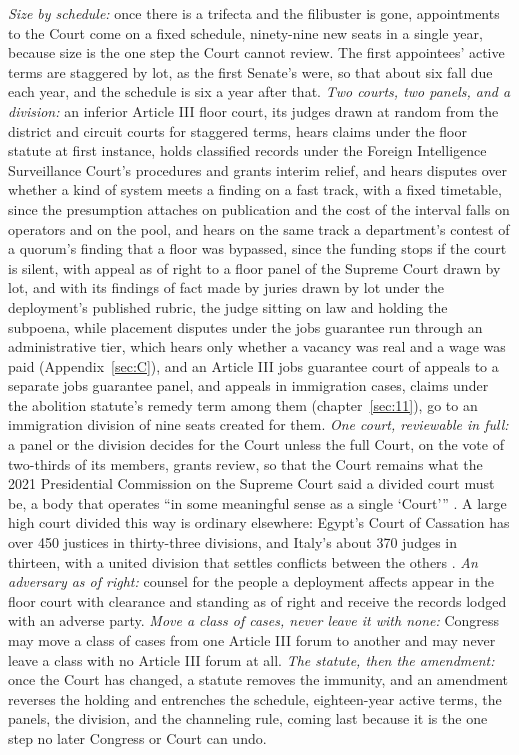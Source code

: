 \emph{Size by schedule:} once there is a trifecta and the filibuster is gone, appointments to the Court come on a fixed schedule, ninety-nine new seats in a single year, because size is the one step the Court cannot review. The first appointees' active terms are staggered by lot, as the first Senate's were, so that about six fall due each year, and the schedule is six a year after that. \emph{Two courts, two panels, and a division:} an inferior Article III floor court, its judges drawn at random from the district and circuit courts for staggered terms, hears claims under the floor statute at first instance, holds classified records under the Foreign Intelligence Surveillance Court's procedures and grants interim relief, and hears disputes over whether a kind of system meets a finding on a fast track, with a fixed timetable, since the presumption attaches on publication and the cost of the interval falls on operators and on the pool, and hears on the same track a department's contest of a quorum's finding that a floor was bypassed, since the funding stops if the court is silent, with appeal as of right to a floor panel of the Supreme Court drawn by lot, and with its findings of fact made by juries drawn by lot under the deployment's published rubric, the judge sitting on law and holding the subpoena, while placement disputes under the jobs guarantee run through an administrative tier, which hears only whether a vacancy was real and a wage was paid (Appendix~\ref{sec:C}), and an Article III jobs guarantee court of appeals to a separate jobs guarantee panel, and appeals in immigration cases, claims under the abolition statute's remedy term among them (chapter~\ref{sec:11}), go to an immigration division of nine seats created for them. \emph{One court, reviewable in full:} a panel or the division decides for the Court unless the full Court, on the vote of two-thirds of its members, grants review, so that the Court remains what the 2021 Presidential Commission on the Supreme Court said a divided court must be, a body that operates “in some meaningful sense as a single ‘Court’” \autocite[89]{scotuscommission2021}. A large high court divided this way is ordinary elsewhere: Egypt's Court of Cassation has over 450 justices in thirty-three divisions, and Italy's about 370 judges in thirteen, with a united division that settles conflicts between the others \autocite{fjc2026egypt,fjc2026italy}. \emph{An adversary as of right:} counsel for the people a deployment affects appear in the floor court with clearance and standing as of right and receive the records lodged with an adverse party. \emph{Move a class of cases, never leave it with none:} Congress may move a class of cases from one Article III forum to another and may never leave a class with no Article III forum at all. \emph{The statute, then the amendment:} once the Court has changed, a statute removes the immunity, and an amendment reverses the holding \autocite{biden2024amendment} and entrenches the schedule, eighteen-year active terms, the panels, the division, and the channeling rule, coming last because it is the one step no later Congress or Court can undo.

